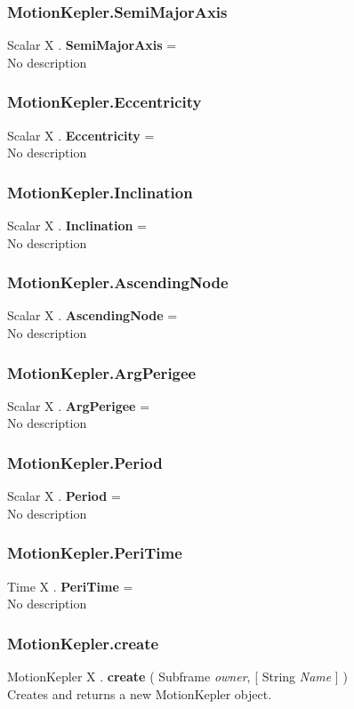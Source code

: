 \documentclass[10pt]{book}
\begin{document}
\subsubsection{MotionKepler.SemiMajorAxis \label{F:MotionKepler:SemiMajorAxis}}
Scalar X . \textbf{SemiMajorAxis} = \\
No description

\subsubsection{MotionKepler.Eccentricity \label{F:MotionKepler:Eccentricity}}
Scalar X . \textbf{Eccentricity} = \\
No description

\subsubsection{MotionKepler.Inclination \label{F:MotionKepler:Inclination}}
Scalar X . \textbf{Inclination} = \\
No description

\subsubsection{MotionKepler.AscendingNode \label{F:MotionKepler:AscendingNode}}
Scalar X . \textbf{AscendingNode} = \\
No description

\subsubsection{MotionKepler.ArgPerigee \label{F:MotionKepler:ArgPerigee}}
Scalar X . \textbf{ArgPerigee} = \\
No description

\subsubsection{MotionKepler.Period \label{F:MotionKepler:Period}}
Scalar X . \textbf{Period} = \\
No description

\subsubsection{MotionKepler.PeriTime \label{F:MotionKepler:PeriTime}}
Time X . \textbf{PeriTime} = \\
No description

\subsubsection{MotionKepler.create \label{F:MotionKepler:create}}
MotionKepler X . \textbf{create} ( Subframe \textit{owner},  [ String \textit{Name} ] ) \\
Creates and returns a new MotionKepler object.
\end{document}
